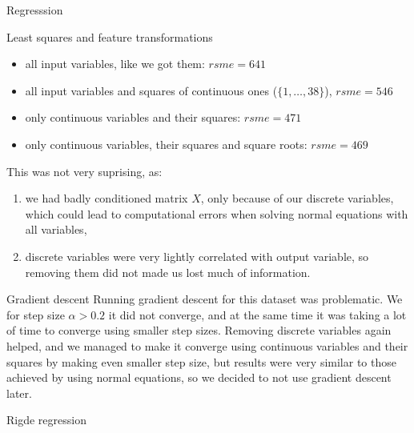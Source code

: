 \documentclass{article}
\begin{document}
\begin{section}{Regresssion}
\begin{subsection}{Least squares and feature transformations}
\begin{itemize}
\item all input variables, like we got them: $rsme=641$
\item all input variables and squares of continuous ones ($\{1, \ldots, 38\}$), $rsme = 546$
\item only continuous variables and their squares: $rsme = 471$
\item only continuous variables, their squares and square roots: $rsme = 469$
\end{itemize}
This was not very suprising, as:
\begin{enumerate}
\item we had badly conditioned matrix $X$, only because of our discrete variables, which could lead to computational errors when solving normal equations with all variables,
\item discrete variables were very lightly correlated with output variable, so removing them did not made us lost much of information.
\end{enumerate}
\end{subsection}
\begin{subsection}{Gradient descent}
Running gradient descent for this dataset was problematic. We for step size $\alpha > 0.2$ it did not converge, and at the same time it was taking a lot of time to converge using smaller step sizes. Removing discrete variables again helped, and we managed to make it converge using continuous variables and their squares by making even smaller step size, but results were very similar to those achieved by using normal equations, so we decided to not use gradient descent later.
\end{subsection}
\begin{subsection}{Rigde regression}
\end{subsection}
\end{section}
\end{document}
